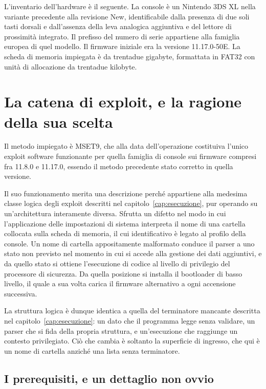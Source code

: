 L'inventario dell'hardware è il seguente. La console è un Nintendo 3DS XL nella variante precedente alla revisione New, identificabile dalla presenza di due soli tasti dorsali e dall'assenza della leva analogica aggiuntiva e del lettore di prossimità integrato. Il prefisso del numero di serie appartiene alla famiglia europea di quel modello. Il firmware iniziale era la versione 11.17.0-50E. La scheda di memoria impiegata è da trentadue gigabyte, formattata in FAT32 con unità di allocazione da trentadue kilobyte.

\section{La catena di exploit, e la ragione della sua scelta}

Il metodo impiegato è MSET9, che alla data dell'operazione costituiva l'unico exploit software funzionante per quella famiglia di console sui firmware compresi fra 11.8.0 e 11.17.0, essendo il metodo precedente stato corretto in quella versione.

Il suo funzionamento merita una descrizione perché appartiene alla medesima classe logica degli exploit descritti nel capitolo~\ref{cap:esecuzione}, pur operando su un'architettura interamente diversa. Sfrutta un difetto nel modo in cui l'applicazione delle impostazioni di sistema interpreta il nome di una cartella collocata sulla scheda di memoria, il cui identificativo è legato al profilo della console. Un nome di cartella appositamente malformato conduce il parser a uno stato non previsto nel momento in cui si accede alla gestione dei dati aggiuntivi, e da quello stato si ottiene l'esecuzione di codice al livello di privilegio del processore di sicurezza. Da quella posizione si installa il bootloader di basso livello, il quale a sua volta carica il firmware alternativo a ogni accensione successiva.

La struttura logica è dunque identica a quella del terminatore mancante descritta nel capitolo~\ref{cap:esecuzione}: un dato che il programma legge senza validare, un parser che si fida della propria struttura, e un'esecuzione che raggiunge un contesto privilegiato. Ciò che cambia è soltanto la superficie di ingresso, che qui è un nome di cartella anziché una lista senza terminatore.

\subsection{I prerequisiti, e un dettaglio non ovvio}

